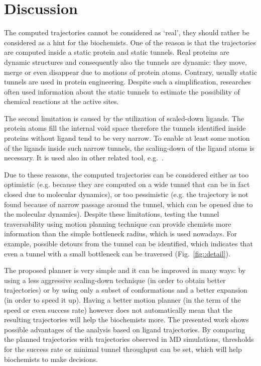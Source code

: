 \documentclass[usletter, 10pt, conference]{ieeeconf} %
\begin{document}
\section{Discussion}

The computed trajectories cannot be considered as `real', they should rather be considered as a hint for the biochemists.
One of the reason is that the trajectories are computed inside a static protein and static tunnels.
Real proteins are dynamic structures and consequently also the tunnels are dynamic: they move, merge or even disappear due to motions of protein atoms.
Contrary, usually static tunnels are used in protein engineering.
Despite such a simplification, researches often used information about the static tunnels  to estimate the possibility of chemical reactions
at the active sites.

The second limitation is caused by the utilization of scaled-down ligands.
The protein atoms fill the internal void space therefore the tunnels identified inside proteins without ligand tend
to be very narrow.
To enable at least some motion of the ligands inside such narrow tunnels, the scaling-down of the ligand atoms is necessary.
It is used also in other related tool, e.g.~\cite{cortes2005path}.

Due to these reasons, the computed trajectories can be considered either as too optimistic
(e.g. because they are computed on a wide tunnel that can be in fact closed due to molecular dynamics),
or too pessimistic (e.g. the trajectory is not found because of narrow passage around the tunnel, which can be 
opened due to the molecular dynamics).
Despite these limitations, testing the tunnel traversability using motion planning technique can provide chemists more information
than the simple bottleneck radius, which is used nowadays.
For example, possible detours from the tunnel can be identified, which indicates that even a tunnel with a small
bottleneck can be traversed (Fig.~\ref{fig::detail}).


The proposed planner is very simple and it can be improved in many ways: by using a less aggressive scaling-down technique (in order
to obtain better trajectories) or by using only a subset of conformations and a better expansion (in order to speed it up).
Having a better motion planner (in the term of the speed or even success rate) however does not automatically mean that the resulting trajectories will help the biochemists more.
The presented work shows possible advantages of the analysis based on ligand trajectories.
By comparing the planned trajectories with trajectories observed in MD simulations, thresholds for the success rate or minimal tunnel throughput can be set, which will help biochemists to make decisions.
\end{document}
